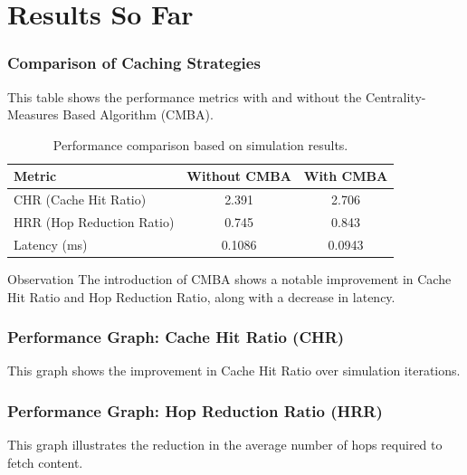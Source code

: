 \documentclass{beamer}
\begin{document}
\section{Results So Far}
\begin{frame}
  \frametitle{Comparison of Caching Strategies}
  This table shows the performance metrics with and without the Centrality-Measures Based Algorithm (CMBA).
  \begin{table}[h]
    \centering
    \begin{tabular}{l c c}
      \toprule
      \textbf{Metric} & \textbf{Without CMBA} & \textbf{With CMBA} \\
      \midrule
      CHR (Cache Hit Ratio) & 2.391 & 2.706 \\
      HRR (Hop Reduction Ratio) & 0.745 & 0.843 \\
      Latency (ms) & 0.1086 & 0.0943 \\
      \bottomrule
    \end{tabular}
    \caption{Performance comparison based on simulation results.}
  \end{table}
  \begin{alertblock}{Observation}
  The introduction of CMBA shows a notable improvement in Cache Hit Ratio and Hop Reduction Ratio, along with a decrease in latency.
  \end{alertblock}
\end{frame}

\begin{frame}
  \frametitle{Performance Graph: Cache Hit Ratio (CHR)}
  \justify
  This graph shows the improvement in Cache Hit Ratio over simulation iterations.
  
\end{frame}

\begin{frame}
  \frametitle{Performance Graph: Hop Reduction Ratio (HRR)}
  \justify
  This graph illustrates the reduction in the average number of hops required to fetch content.
  
\end{frame}
\end{document}
